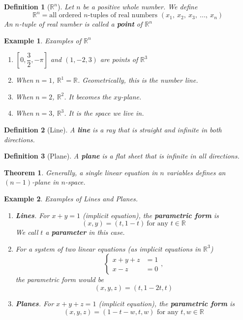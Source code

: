 \documentclass[12pt, a4paper]{article}
\newtheorem{thm}{Theorem}[subsection]
\newtheorem{df}{Definition}[subsection]
\newtheorem{eg}{Example}[subsection]
\def\R{{\mathbb{R}}}
\begin{document}
\begin{df}[$\R^n$]
Let $n$ be a positive whole number. We define
$$\R^n=\text{all ordered }n\text{-tuples of real numbers }(x_1,\ x_2,\ x_3,\ ...,\ x_n)$$
An $n$-tuple of real number is called a \textbf{point} of $\R^n$
\end{df}
\begin{eg}
Examples of $\R^n$
\begin{enumerate}
\item $\left[0, \dfrac{3}{2},-\pi\right]$ and $(1, -2, 3)$ are points of $\R^3$
\item When $n=1$, $\R^1=\R$. Geometrically, this is the number line.
\item When $n=2$, $\R^2$. It becomes the $xy$-plane. 
\item When $n=3$, $\R^3$. It is the \textit{space} we live in. 
\end{enumerate}
\end{eg}


\begin{df}[Line]
A \textbf{line} is a ray that is \textit{straight} and \textit{infinite} in both directions.
\end{df}
\begin{df}[Plane]
A \textbf{plane} is a flat sheet that is infinite in all directions.
\end{df}
\begin{thm}
Generally, a single linear equation in $n$ variables defines an $(n-1)$-plane in $n$-space. 
\end{thm}

\begin{eg}
Examples of Lines and Planes. \par
\begin{enumerate}
\item \textbf{Lines}. For $x+y=1$ (implicit equation), the \textbf{parametric form} is $$(x,y)=(t, 1-t)\ \text{for any } t \in \R$$
We call $t$ a \textbf{parameter} in this case.
\item For a system of two linear equations (as implicit equations in $\R^3$) $$\left\{\begin{aligned}x+y+z&=1\\x-z&=0\end{aligned}\right., $$ the parametric form would be $$(x,y,z)=(t,1-2t,t)$$
\item \textbf{Planes}. For $x+y+z=1$ (implicit equation), the \textbf{parametric form} is $$(x,y,z)=(1-t-w,t,w) \text{ for any } t,w \in \mathbb{R}$$
\end{enumerate}
\end{eg}
\end{document}
